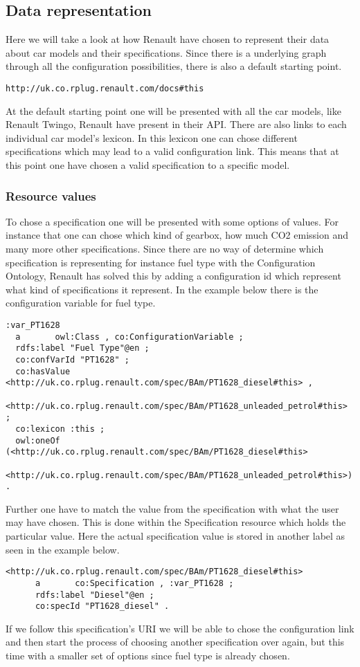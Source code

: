 \subsection{Data representation}
Here we will take a look at how Renault have chosen to represent their data about
car models and their specifications. Since there is a underlying graph through all the
configuration possibilities, there is also a default starting point.
\begin{verbatim}
http://uk.co.rplug.renault.com/docs#this
\end{verbatim}
At the default starting point one will be presented with all the car models, like Renault Twingo, Renault
have present in their API. There are also links to each individual car model's lexicon. 
In this lexicon one can chose different specifications which may lead to a valid configuration link.
This means that at this point one have chosen a valid specification to a specific model.
\subsubsection{Resource values}
To chose a specification one will be presented with some options of values. 
For instance that one can chose which kind of gearbox, how much CO2 emission
and many more other specifications. 
Since there are no way of determine which specification is representing for instance fuel type 
with the Configuration Ontology, Renault has solved this by adding a configuration id
which represent what kind of specifications it represent. In the example below there
is the configuration variable for fuel type.
\tiny\begin{verbatim}
:var_PT1628
  a       owl:Class , co:ConfigurationVariable ;
  rdfs:label "Fuel Type"@en ;
  co:confVarId "PT1628" ;
  co:hasValue <http://uk.co.rplug.renault.com/spec/BAm/PT1628_diesel#this> , 
	      <http://uk.co.rplug.renault.com/spec/BAm/PT1628_unleaded_petrol#this> ;
  co:lexicon :this ;
  owl:oneOf (<http://uk.co.rplug.renault.com/spec/BAm/PT1628_diesel#this> 
	      <http://uk.co.rplug.renault.com/spec/BAm/PT1628_unleaded_petrol#this>) .
\end{verbatim}
\normalsize
Further one have to match the value from the specification with what the user may have chosen.
This is done within the Specification resource which holds the particular value. Here the actual
specification value is stored in another label as seen in the example below.
\tiny\begin{verbatim}
<http://uk.co.rplug.renault.com/spec/BAm/PT1628_diesel#this>
      a       co:Specification , :var_PT1628 ;
      rdfs:label "Diesel"@en ;
      co:specId "PT1628_diesel" .
\end{verbatim}
\normalsize
If we follow this specification's URI we will be able to chose the configuration link and then start 
the process of choosing another specification over again, but this time with a smaller set of options
since fuel type is already chosen.

